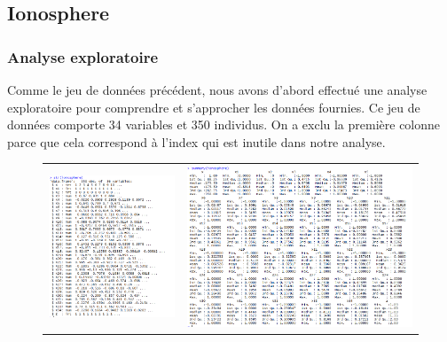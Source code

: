 \documentclass[a4paper,11pt,oneside,roman]{article}
\begin{document}
\subsection{Ionosphere}
\subsubsection{Analyse exploratoire}
Comme le jeu de données précédent, nous avons d'abord effectué une analyse exploratoire pour comprendre et s'approcher les données fournies. \newline
Ce jeu de données comporte 34 variables et 350 individus. On a exclu la première colonne parce que cela correspond à l'index qui est inutile dans notre analyse.
\begin{figure}[htb]
    \centering
    \begin{tabular}{cc}
    \includegraphics[scale = .5]{./discrimination/ionosphere/str.PNG} &
    \includegraphics[scale = .5]{./discrimination/ionosphere/summary.PNG}

\end{tabular}
\end{figure}
\end{document}
